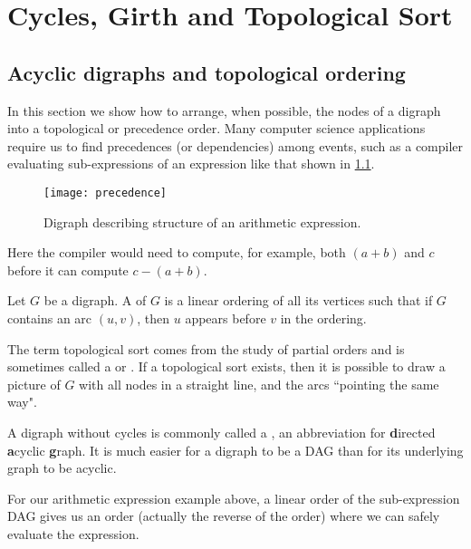 \chapter{Cycles, Girth and Topological Sort}


\section{Acyclic digraphs and topological ordering}
\label{sec:dag}

In this section we show how to arrange, when possible, the nodes
of a digraph into a topological or precedence order.  Many computer
science applications require us to find precedences (or dependencies)
among events, such as a compiler evaluating sub-expressions of an
expression like that shown in \cref{fig:prec}.

\begin{figure}[hbtp]
	\centering
	\texttt{[image: precedence]}
	\caption{Digraph describing structure of an arithmetic expression.}
	\label{fig:prec}
\end{figure} 

Here the compiler would need to compute, for example, both $(a+b)$ and
$c$ before it can compute $c-(a+b)$.

\begin{Definition}
Let $G$ be a digraph. A  of $G$ is a linear
ordering of all its vertices such that if $G$ contains an arc $(u,v)$,
then $u$ appears before $v$ in the ordering.
\end{Definition}

The term topological sort comes from the study of partial orders and is
sometimes called a  or .
 If a topological sort exists, then it is possible to draw a picture  of
$G$ with all nodes in a straight line, and the arcs ``pointing the same
way".

A digraph without cycles is commonly called a , an
abbreviation for \textbf{d}irected \textbf{a}cyclic
\textbf{g}raph. It is much easier for a digraph to be a
DAG than for its underlying graph to be acyclic. %

For our arithmetic expression example above, a linear
order of the sub-expression DAG gives us an order (actually the reverse
of the order) where we can safely evaluate the expression.

